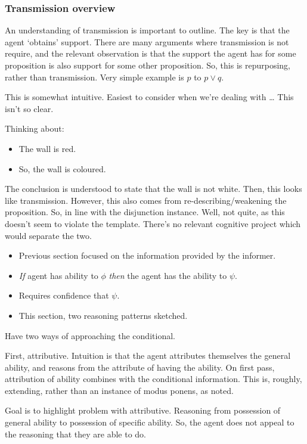 \documentclass[10pt]{article}
\begin{document}
\subsubsection{Transmission overview}
\label{sec:transm-overv}

\begin{note}[Transmission]
  An understanding of transmission is important to outline.
  The key is that the agent `obtains' support.
  There are many arguments where transmission is not require, and the relevant observation is that the support the agent has for some proposition is also support for some other proposition.
  So, this is repurposing, rather than transmission.
  Very simple example is \(p\) to \(p \lor q\).

  This is somewhat intuitive.
  Easiest to consider when we're dealing with \dots
  This isn't so clear.

  Thinking about:
  \begin{itemize}
  \item The wall is red.
  \item So, the wall is coloured.
  \end{itemize}
  The conclusion is understood to state that the wall is not white.
  Then, this looks like transmission.
  However, this also comes from re-describing/weakening the proposition.
  So, in line with the disjunction instance.
  Well, not quite, as this doesn't seem to violate the template.
  There's no relevant cognitive project which would separate the two.
\end{note}

\begin{itemize}
\item Previous section focused on the information provided by the informer.
\item \emph{If} agent has ability to \(\phi\) \emph{then} the agent has the ability to \(\psi\).
\item Requires confidence that \(\psi\).
\item This section, two reasoning patterns sketched.
\end{itemize}

\begin{note}[Goals]
  Have two ways of approaching the conditional.

  First, attributive.
  Intuition is that the agent attributes themselves the general ability, and reasons from the attribute of having the ability.
  On first pass, attribution of ability combines with the conditional information.
  This is, roughly, extending, rather than an instance of modus ponens, as noted.

  Goal is to highlight problem with attributive.
  Reasoning from possession of general ability to possession of specific ability.
  So, the agent does not appeal to the reasoning that they are able to do.
\end{note}
\end{document}
